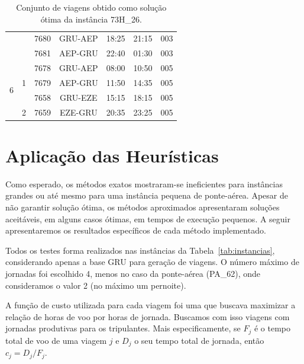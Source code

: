 \begin{table}[htb]
\begin{center}
{\begin{tabular}{|c|c|ccccc|}
			&	&	7680 & GRU-AEP & 18:25 & 21:15 & 003 \\
			&	&	7681 & AEP-GRU & 22:40 & 01:30 & 003 \\ \hline \hline
			\multirow{4}{*}{6} & \multirow{3}{*}{1}  
				& 7678 & GRU-AEP & 08:00 & 10:50 & 005 \\
			& & 7679 & AEP-GRU & 11:50 & 14:35 & 005 \\
			&	& 7658 & GRU-EZE & 15:15 & 18:15 & 005 \\ \cline{2-7}
                           	 & \multirow{1}{*}{2}
				& 7659 & EZE-GRU & 20:35 & 23:25 & 005 \\ \hline
		\end{tabular}}
		\caption{Conjunto de viagens obtido como solução ótima da instância 73H\_26.}
		\label{tab:pairings}
	\end{center}
\end{table}


\section{Aplicação das Heurísticas}
\label{sec:aplicacao_heuristicas}

Como esperado, os métodos exatos mostraram-se ineficientes para instâncias grandes ou até mesmo para
uma instância pequena de ponte-aérea. Apesar de não garantir solução ótima, os métodos aproximados
apresentaram soluções aceitáveis, em alguns casos ótimas, em tempos de execução pequenos. A seguir
apresentaremos os resultados específicos de cada método implementado.

Todos os testes forma realizados nas instâncias da Tabela~\ref{tab:instancias}, considerando apenas
a base GRU para geração de viagens. O número máximo de jornadas foi escolhido 4, menos no caso da
ponte-aérea (PA\_62), onde consideramos o valor 2 (no máximo um pernoite).

A função de custo utilizada para cada viagem foi uma que buscava maximizar a relação de horas de voo
por horas de jornada. Buscamos com isso viagens com jornadas produtivas para os tripulantes. Mais
especificamente, se $F_j$ é o tempo total de voo de uma viagem $j$ e $D_j$ o seu tempo total de
jornada, então $c_j = D_j / F_j$.


